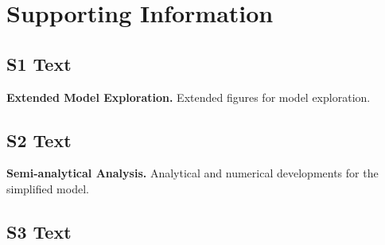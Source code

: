 \documentclass[10pt,letterpaper]{article}
\begin{document}
\section*{Supporting Information}



\subsection*{S1 Text}
\label{S1_Text}
{\bf Extended Model Exploration.} Extended figures for model exploration.

\subsection*{S2 Text}
\label{S2_Text}
{\bf Semi-analytical Analysis.} Analytical and numerical developments for the simplified model.

\subsection*{S3 Text}
\label{S3_Text}
{\bf {}} 








\nolinenumbers

%
%
% 
\end{document}
